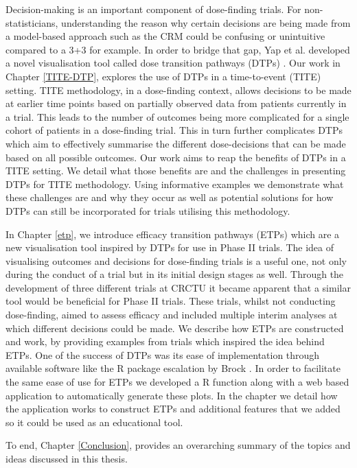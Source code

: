 Decision-making is an important component of dose-finding trials. For non-statisticians, understanding the reason why certain decisions are being made from a model-based approach such as the CRM could be confusing or unintuitive compared to a 3+3 for example. In order to bridge that gap, Yap et al. developed a novel visualisation tool called dose transition pathways (DTPs) \cite{yapDoseTransitionPathways2017}. Our work in Chapter \ref{TITE-DTP}, explores the use of DTPs in a time-to-event (TITE) setting. TITE methodology, in a dose-finding context, allows decisions to be made at earlier time points based on partially observed data from patients currently in a trial. This leads to the number of outcomes being more complicated for a single cohort of patients in a dose-finding trial. This in turn further complicates DTPs which aim to effectively summarise the different dose-decisions that can be made based on all possible outcomes. Our work aims to reap the benefits of DTPs in a TITE setting. We detail what those benefits are and the challenges in presenting DTPs for TITE methodology. Using informative examples we demonstrate what these challenges are and why they occur as well as potential solutions for how DTPs can still be incorporated for trials utilising this methodology. 

In Chapter \ref{etp}, we introduce efficacy transition pathways (ETPs) which are a new visualisation tool inspired by DTPs for use in Phase \RN{2} trials. The idea of visualising outcomes and decisions for dose-finding trials is a useful one, not only during the conduct of a trial but in its initial design stages as well. Through the development of three different trials at CRCTU it became apparent that a similar tool would be beneficial for Phase \RN{2} trials. These trials, whilst not conducting dose-finding, aimed to assess efficacy and included multiple interim analyses at which different decisions could be made. We describe how ETPs are constructed and work, by providing examples from trials which inspired the idea behind ETPs. One of the success of DTPs was its ease of implementation through available software like the R package escalation by Brock \cite{brockModularApproachDose2020}. In order to facilitate the same ease of use for ETPs we developed a R function along with a web based application to automatically generate these plots. In the chapter we detail how the application works to construct ETPs and additional features that we added so it could be used as an educational tool. 

To end, Chapter \ref{Conclusion}, provides an overarching summary of the topics and ideas discussed in this thesis. 



